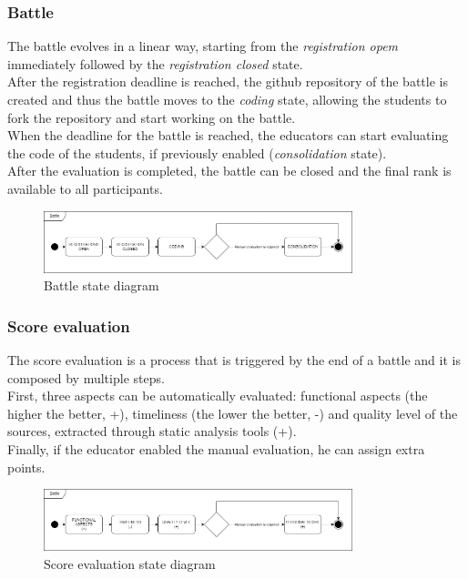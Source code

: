 \subsubsection*{Battle}
The battle evolves in a linear way, starting from the \textit{registration opem} immediately followed by the \textit{registration closed} state.\\
After the registration deadline is reached, the github repository of the battle is created and thus the battle moves to the \textit{coding} state, allowing the students to fork the repository and start working on the battle.\\
When the deadline for the battle is reached, the educators can start evaluating the code of the students, if previously enabled (\textit{consolidation} state). \\
After the evaluation is completed, the battle can be closed and the final rank is available to all participants.\\

\begin{figure}
    \centering
    \includegraphics[width=0.8\textwidth]{state_diagrams/battle.jpg}
    \caption{Battle state diagram}
\end{figure}

\subsubsection*{Score evaluation}
The score evaluation is a process that is triggered by the end of a battle and it is composed by multiple steps.\\
First, three aspects can be automatically evaluated: functional aspects (the higher the better, +), timeliness (the lower the better, -) and quality level of the sources, extracted through static analysis tools (+). \\
Finally, if the educator enabled the manual evaluation, he can assign extra points. \\

\begin{figure}
    \centering
    \includegraphics[width=0.8\textwidth]{state_diagrams/score_evaluation.jpg}
    \caption{Score evaluation state diagram}
\end{figure}

